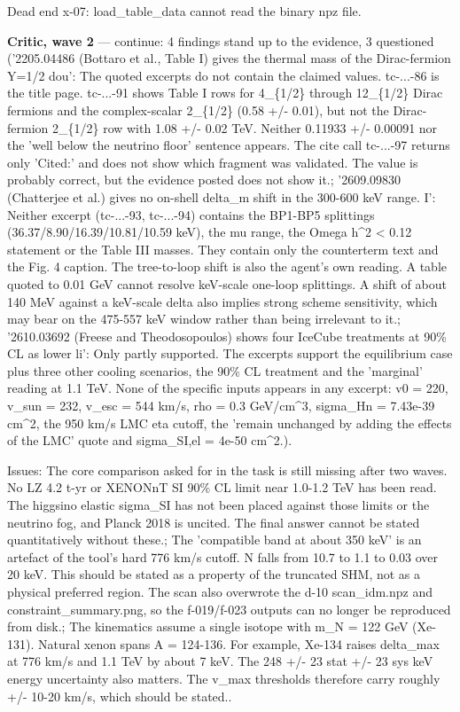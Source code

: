 \documentclass[11pt,a4paper]{article}
\begin{document}
Dead end x-07: load\_table\_data cannot read the binary npz file.

\textbf{Critic, wave 2} --- continue: 4 findings stand up to the evidence, 3 questioned ('2205.04486 (Bottaro et al., Table I) gives the thermal mass of the Dirac-fermion Y=1/2 dou': The quoted excerpts do not contain the claimed values. tc-...-86 is the title page. tc-...-91 shows Table I rows for 4\_\{1/2\} through 12\_\{1/2\} Dirac fermions and the complex-scalar 2\_\{1/2\} (0.58 +/- 0.01), but not the Dirac-fermion 2\_\{1/2\} row with 1.08 +/- 0.02 TeV. Neither 0.11933 +/- 0.00091 nor the 'well below the neutrino floor' sentence appears. The cite call tc-...-97 returns only 'Cited:' and does not show which fragment was validated. The value is probably correct, but the evidence posted does not show it.; '2609.09830 (Chatterjee et al.) gives no on-shell delta\_m shift in the 300-600 keV range. I': Neither excerpt (tc-...-93, tc-...-94) contains the BP1-BP5 splittings (36.37/8.90/16.39/10.81/10.59 keV), the \textbar{}mu\textbar{} range, the Omega h\textasciicircum{}2 \textless{} 0.12 statement or the Table III masses. They contain only the counterterm text and the Fig. 4 caption. The tree-to-loop shift is also the agent's own reading. A table quoted to 0.01 GeV cannot resolve keV-scale one-loop splittings. A shift of about 140 MeV against a keV-scale delta also implies strong scheme sensitivity, which may bear on the 475-557 keV window rather than being irrelevant to it.; '2610.03692 (Freese and Theodosopoulos) shows four IceCube treatments at 90\% CL as lower li': Only partly supported. The excerpts support the equilibrium case plus three other cooling scenarios, the 90\% CL treatment and the 'marginal' reading at 1.1 TeV. None of the specific inputs appears in any excerpt: v0 = 220, v\_sun = 232, v\_esc = 544 km/s, rho = 0.3 GeV/cm\textasciicircum{}3, sigma\_Hn = 7.43e-39 cm\textasciicircum{}2, the 950 km/s LMC eta cutoff, the 'remain unchanged by adding the effects of the LMC' quote and sigma\_SI,el = 4e-50 cm\textasciicircum{}2.).

Issues: The core comparison asked for in the task is still missing after two waves. No LZ 4.2 t-yr or XENONnT SI 90\% CL limit near 1.0-1.2 TeV has been read. The higgsino elastic sigma\_SI has not been placed against those limits or the neutrino fog, and Planck 2018 is uncited. The final answer cannot be stated quantitatively without these.; The 'compatible band at about 350 keV' is an artefact of the tool's hard 776 km/s cutoff. N falls from 10.7 to 1.1 to 0.03 over 20 keV. This should be stated as a property of the truncated SHM, not as a physical preferred region. The scan also overwrote the d-10 scan\_idm.npz and constraint\_summary.png, so the f-019/f-023 outputs can no longer be reproduced from disk.; The kinematics assume a single isotope with m\_N = 122 GeV (Xe-131). Natural xenon spans A = 124-136. For example, Xe-134 raises delta\_max at 776 km/s and 1.1 TeV by about 7 keV. The 248 +/- 23 stat +/- 23 sys keV energy uncertainty also matters. The v\_max thresholds therefore carry roughly +/- 10-20 km/s, which should be stated..
\end{document}
